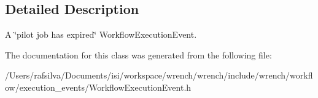 \subsection{Detailed Description}
A \char`\"{}pilot job has expired\char`\"{} Workflow\+Execution\+Event. 

The documentation for this class was generated from the following file\+:\begin{DoxyCompactItemize}
\item 
/\+Users/rafsilva/\+Documents/isi/workspace/wrench/wrench/include/wrench/workflow/execution\+\_\+events/Workflow\+Execution\+Event.\+h\end{DoxyCompactItemize}
